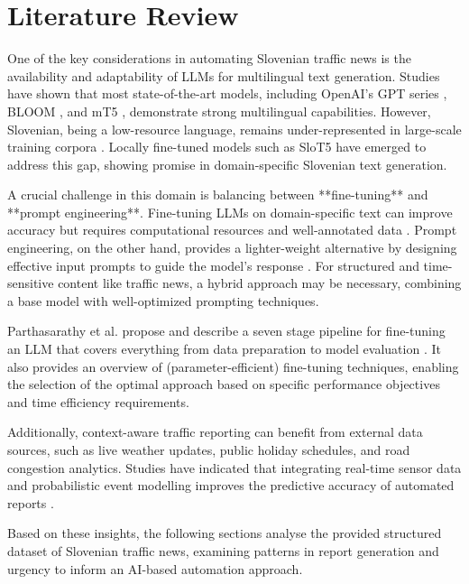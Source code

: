 \section*{Literature Review} 
One of the key considerations in automating Slovenian traffic news is the availability and adaptability of LLMs for multilingual text generation. Studies have shown that most state-of-the-art models, including OpenAI’s GPT series \cite{brown2020language}, BLOOM \cite{scao2022bloom}, and mT5 \cite{xue2021mt5}, demonstrate strong multilingual capabilities. However, Slovenian, being a low-resource language, remains under-represented in large-scale training corpora \cite{ulcar2021sloberta}. Locally fine-tuned models such as SloT5 \cite{ulcar2022slot5} have emerged to address this gap, showing promise in domain-specific Slovenian text generation.

A crucial challenge in this domain is balancing between **fine-tuning** and **prompt engineering**. Fine-tuning LLMs on domain-specific text can improve accuracy but requires computational resources and well-annotated data \cite{zhang2022fine}. Prompt engineering, on the other hand, provides a lighter-weight alternative by designing effective input prompts to guide the model’s response \cite{reynolds2021prompt}. For structured and time-sensitive content like traffic news, a hybrid approach may be necessary, combining a base model with well-optimized prompting techniques.

Parthasarathy et al. propose and describe a seven stage pipeline for fine-tuning an LLM that covers everything from data preparation to model evaluation \cite{ultimate2024}.
It also provides an overview of (parameter-efficient) fine-tuning techniques, enabling the selection of the optimal approach based on specific performance objectives and time efficiency requirements.

Additionally, context-aware traffic reporting can benefit from external data sources, such as live weather updates, public holiday schedules, and road congestion analytics. Studies have indicated that integrating real-time sensor data and probabilistic event modelling improves the predictive accuracy of automated reports \cite{schelter2019automated}.

Based on these insights, the following sections analyse the provided structured dataset of Slovenian traffic news, examining patterns in report generation and urgency to inform an AI-based automation approach.
